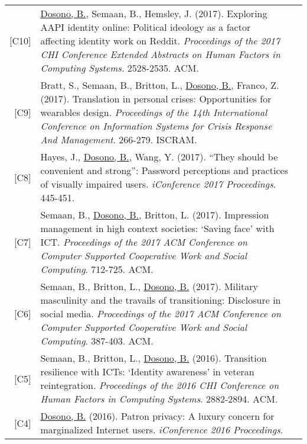 \documentclass[11pt]{article}
\begin{document}
{{\begin{longtable}{Rp{0.75in}p{5.0in}}
\footnotesize{[C10]} & \href{https://dl.acm.org/authorize?N41342}{Dosono, B.}, Semaan, B., Hemsley, J. (2017). Exploring AAPI identity online: Political ideology as a factor affecting identity work on Reddit. \textit{Proceedings of the 2017 CHI Conference Extended Abstracts on Human Factors in Computing Systems}. 2528-2535. ACM.\\

\footnotesize{[C9]} & Bratt, S., Semaan, B., Britton, L., \href{http://idl.iscram.org/files/sarahbratt/2017/2017_SarahBratt_etal2017.pdf}{Dosono, B.}, Franco, Z. (2017). Translation in personal crises: Opportunities for wearables design. \textit{Proceedings of the 14th International Conference on Information Systems for Crisis Response And Management}. 266-279. ISCRAM.\\

\footnotesize{[C8]} & Hayes, J., \href{http://hdl.handle.net/2142/96755}{Dosono, B.}, Wang, Y. (2017). ``They should be convenient and strong'': Password perceptions and practices of visually impaired users. \textit{iConference 2017 Proceedings}. 445-451.\\

\footnotesize{[C7]} & Semaan, B., \href{https://dl.acm.org/authorize?N41343}{Dosono, B.}, Britton, L. (2017). Impression management in high context societies: `Saving face' with ICT. \textit{Proceedings of the 2017 ACM Conference on Computer Supported Cooperative Work and Social Computing}. 712-725. ACM.\\

\footnotesize{[C6]} & Semaan, B., Britton, L., \href{https://dl.acm.org/authorize?N41344}{Dosono, B.} (2017). Military masculinity and the travails of transitioning: Disclosure in social media. \textit{Proceedings of the 2017 ACM Conference on Computer Supported Cooperative Work and Social Computing}. 387-403. ACM.\\

\footnotesize{[C5]} & Semaan, B., Britton, L., \href{https://dl.acm.org/authorize?N41455}{Dosono, B.} (2016). Transition resilience with ICTs: `Identity awareness' in veteran reintegration. \textit{Proceedings of the 2016 CHI Conference on Human Factors in Computing Systems}. 2882-2894. ACM.\\

\footnotesize{[C4]} & \href{https://doi.org/10.9776/16285}{Dosono, B.} (2016). Patron privacy: A luxury concern for marginalized Internet users. \textit{iConference 2016 Proceedings}.\\


\end{longtable}}}
\end{document}
